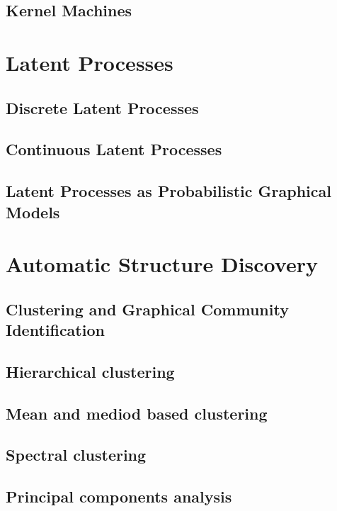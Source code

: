 \documentclass[10pt]{article}
\begin{document}
\subsection{Kernel Machines}

\section{Latent Processes}

\subsection{Discrete Latent Processes}

\subsection{Continuous Latent Processes}

\subsection{Latent Processes as Probabilistic Graphical Models}

\section{Automatic Structure Discovery}

\subsection{Clustering and Graphical Community Identification}

\subsection{Hierarchical clustering}

\subsection{Mean and mediod based clustering}

\subsection{Spectral clustering}

\subsection{Principal components analysis}
\end{document}
